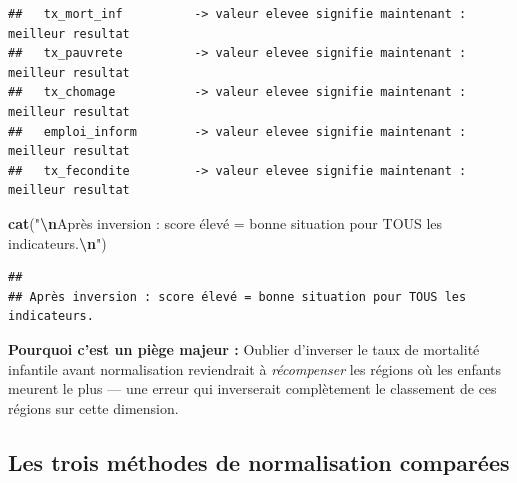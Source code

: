 \documentclass[
]{article}
\newenvironment{Shaded}{\begin{snugshade}}{\end{snugshade}}
\newcommand{\FunctionTok}[1]{\textcolor[rgb]{0.13,0.29,0.53}{\textbf{#1}}}
\newcommand{\NormalTok}[1]{#1}
\newcommand{\SpecialCharTok}[1]{\textcolor[rgb]{0.81,0.36,0.00}{\textbf{#1}}}
\newcommand{\StringTok}[1]{\textcolor[rgb]{0.31,0.60,0.02}{#1}}
\begin{document}
\begin{verbatim}
##   tx_mort_inf          -> valeur elevee signifie maintenant : meilleur resultat
##   tx_pauvrete          -> valeur elevee signifie maintenant : meilleur resultat
##   tx_chomage           -> valeur elevee signifie maintenant : meilleur resultat
##   emploi_inform        -> valeur elevee signifie maintenant : meilleur resultat
##   tx_fecondite         -> valeur elevee signifie maintenant : meilleur resultat
\end{verbatim}

\begin{Shaded}
\begin{Highlighting}[]
\FunctionTok{cat}\NormalTok{(}\StringTok{"}\SpecialCharTok{\textbackslash{}n}\StringTok{Après inversion : score élevé = bonne situation pour TOUS les indicateurs.}\SpecialCharTok{\textbackslash{}n}\StringTok{"}\NormalTok{)}
\end{Highlighting}
\end{Shaded}

\begin{verbatim}
## 
## Après inversion : score élevé = bonne situation pour TOUS les indicateurs.
\end{verbatim}

\textbf{Pourquoi c'est un piège majeur :} Oublier d'inverser le taux de
mortalité infantile avant normalisation reviendrait à \emph{récompenser}
les régions où les enfants meurent le plus --- une erreur qui
inverserait complètement le classement de ces régions sur cette
dimension.

\subsection{Les trois méthodes de normalisation
comparées}\label{les-trois-muxe9thodes-de-normalisation-comparuxe9es}
\end{document}
